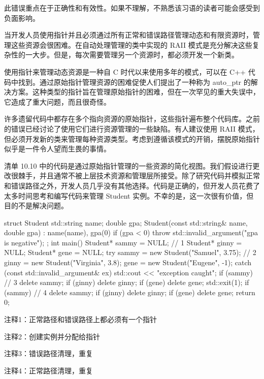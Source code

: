 此错误重点在于正确性和有效性。如果不理解，不熟悉该习语的读者可能会感受到负面影响。

当开发人员使用指针并且必须通过所有正常和错误路径管理动态和有限资源时，管理这些资源会很困难。在自动处理管理的类中实现的 RAII 模式是充分解决这些复杂性的一大步。但是，每次需要管理另一个资源时，都必须开发一个新类。

使用指针来管理动态资源是一种自 C 时代以来使用多年的模式，可以在 C++ 代码中找到。通过原始指针管理资源的困难促使人们提出了一种称为 auto\_ptr 的解决方案。这种类型的指针旨在管理原始指针的困难，但在一次罕见的重大失误中，它造成了重大问题，而且很奇怪。


许多遗留代码中都存在多个指向资源的原始指针，这些指针遍布整个代码库。之前的错误已经讨论了使用它们进行资源管理的一些缺陷。有人建议使用 RAII 模式，但必须开发新的类来管理每种资源类型。考虑到遵循该模式的开销，摆脱原始指针似乎是一件令人望而生畏的事情。

清单 10.10 中的代码是通过原始指针管理的一些资源的简化视图。我们假设进行更改很棘手，并且通常不被上层技术资源和管理层所接受。除了研究代码并模拟正常和错误路径之外，开发人员几乎没有其他选择。代码是正确的，但开发人员花费了太多时间思考和编写代码来管理 Student 实例。不幸的是，这一次很有价值，但目的不是解决问题。


\begin{cpp}
struct Student {
  std::string name;
  double gpa;
  Student(const std::string& name, double gpa) : name(name), gpa(0) {
    if (gpa < 0)
      throw std::invalid_argument("gpa is negative");
  }
};
int main() {
  Student* sammy = NULL; // 1
  Student* ginny = NULL;
  Student* gene = NULL;
  try {
    sammy = new Student("Samuel", 3.75); // 2
    ginny = new Student("Virginia", 3.8);
    gene = new Student("Eugene", -1);
  } catch (const std::invalid_argument& ex) {
    std::cout << "exception caught\n";
    if (sammy) // 3
      delete sammy;
    if (ginny)
      delete ginny;
    if (gene)
      delete gene;
    std::exit(1);
  }
  if (sammy) // 4
    delete sammy;
  if (ginny)
    delete ginny;
  if (gene)
    delete gene;
  return 0;
}
\end{cpp}

{\footnotesize
注释1：正常路径和错误路径上都必须有一个指针

注释2：创建实例并分配给指针

注释3：错误路径清理，重复

注释4：正常路径清理，重复
}

